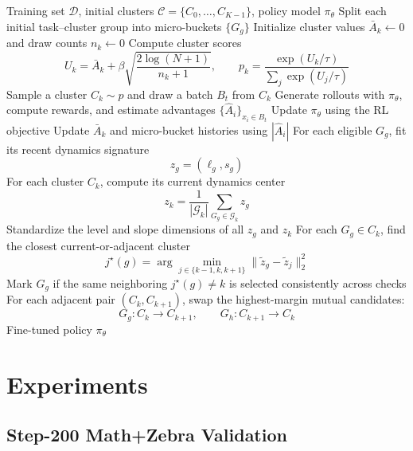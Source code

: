 \documentclass[10pt]{article}
\begin{document}
\begin{algorithm}[H]
\caption{DURCL: Adaptive Cluster Scheduling with Micro-bucket Rebucketing}
\label{alg:adaptive_rebucket}
\small
\begin{algorithmic}[1]
\REQUIRE Training set $\mathcal{D}$, initial clusters $\mathcal{C}=\{C_0,\ldots,C_{K-1}\}$, policy model $\pi_\theta$
\STATE Split each initial task--cluster group into micro-buckets $\{G_g\}$
\STATE Initialize cluster values $\bar A_k\leftarrow 0$ and draw counts $n_k\leftarrow 0$
    \STATE Compute cluster scores
    \[
    U_k=\bar A_k+\beta\sqrt{\frac{2\log(N+1)}{n_k+1}},
    \qquad
    p_k=\frac{\exp(U_k/\tau)}{\sum_j\exp(U_j/\tau)}
    \]
    \STATE Sample a cluster $C_k\sim p$ and draw a batch $B_t$ from $C_k$
    \STATE Generate rollouts with $\pi_\theta$, compute rewards, and estimate advantages $\{\hat A_i\}_{x_i\in B_t}$
    \STATE Update $\pi_\theta$ using the RL objective
    \STATE Update $\bar A_k$ and micro-bucket histories using $|\hat A_i|$
        \STATE For each eligible $G_g$, fit its recent dynamics signature
        \[
        z_g=(\ell_g,s_g)
        \]
        \STATE For each cluster $C_k$, compute its current dynamics center
        \[
        z_k=\frac{1}{|\mathcal{G}_k|}\sum_{G_g\in\mathcal{G}_k}z_g
        \]
        \STATE Standardize the level and slope dimensions of all $z_g$ and $z_k$
        \STATE For each $G_g\in C_k$, find the closest current-or-adjacent cluster
        \[
        j^\star(g)=
        \arg\min_{j\in\{k-1,k,k+1\}}
        \|\tilde z_g-\tilde z_j\|_2^2
        \]
        \STATE Mark $G_g$ if the same neighboring $j^\star(g)\neq k$ is selected consistently across checks
        \STATE For each adjacent pair $(C_k,C_{k+1})$, swap the highest-margin mutual candidates:
        \[
        G_g:C_k\rightarrow C_{k+1},
        \qquad
        G_h:C_{k+1}\rightarrow C_k
        \]
    \ENDIF
\ENDFOR
\RETURN Fine-tuned policy $\pi_\theta$
\end{algorithmic}
\end{algorithm}

\section{Experiments}

\subsection{Step-200 Math+Zebra Validation}
\end{document}
